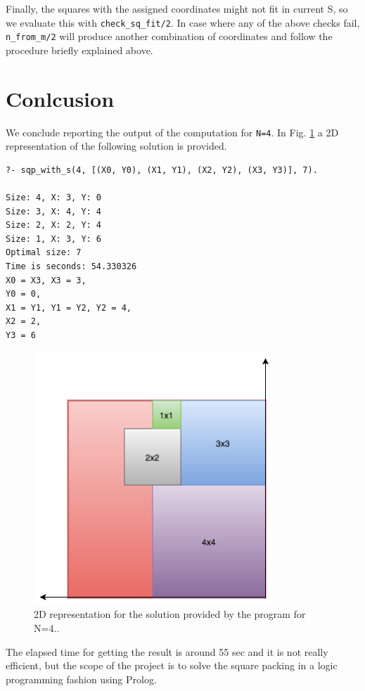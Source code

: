 \documentclass{article}
\begin{document}
Finally, the squares with the assigned coordinates might not fit in current S, so we evaluate this with \texttt{check\_sq\_fit/2}. In case where any of the above checks fail, \texttt{n\_from\_m/2} will produce another combination of coordinates and follow the procedure briefly explained above.

\section{Conlcusion}

We conclude reporting the output of the computation for \texttt{N=4}. In Fig. \ref{fig:sqp} a 2D representation of the following solution is provided.

\begin{verbatim}
?- sqp_with_s(4, [(X0, Y0), (X1, Y1), (X2, Y2), (X3, Y3)], 7).

Size: 4, X: 3, Y: 0
Size: 3, X: 4, Y: 4
Size: 2, X: 2, Y: 4
Size: 1, X: 3, Y: 6
Optimal size: 7
Time is seconds: 54.330326
X0 = X3, X3 = 3,
Y0 = 0,
X1 = Y1, Y1 = Y2, Y2 = 4,
X2 = 2,
Y3 = 6 
\end{verbatim}

\begin{figure}[h]
\includegraphics[width=0.8\textwidth]{sqpn4}
\caption{2D representation for the solution provided by the program for N=4..}
\label{fig:sqp}
\end{figure}

The elapsed time for getting the result is around 55 sec and it is not really efficient, but the scope of the project is to solve the square packing in a logic programming fashion using Prolog.
\end{document}
